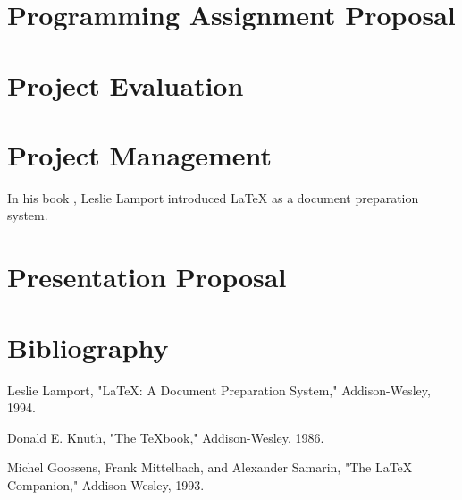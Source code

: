 \documentclass{article}
\begin{document}
\section{Programming Assignment Proposal}

\section{Project Evaluation}

\section{Project Management}
In his book \cite{lamport94}, Leslie Lamport introduced LaTeX as a document preparation system.

\section{Presentation Proposal}

\section{Bibliography}

\begin{thebibliography}{X}

 Leslie Lamport, "LaTeX: A Document Preparation System," Addison-Wesley, 1994.

 Donald E. Knuth, "The TeXbook," Addison-Wesley, 1986.

 Michel Goossens, Frank Mittelbach, and Alexander Samarin, "The LaTeX Companion," Addison-Wesley, 1993.

\end{thebibliography}
\end{document}
